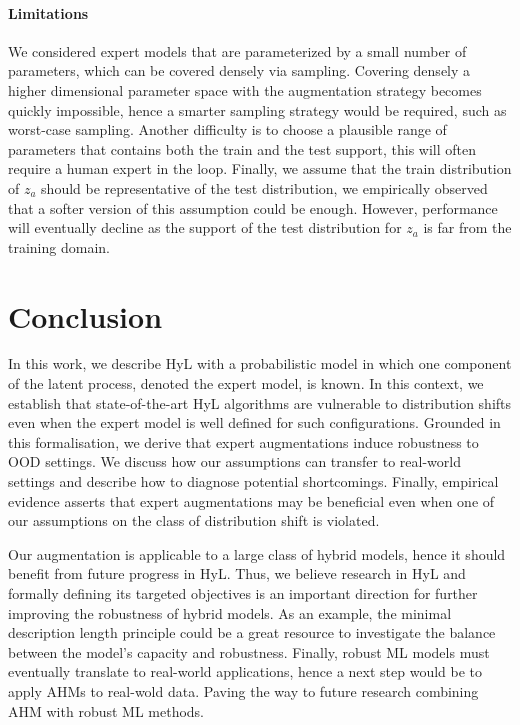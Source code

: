 \paragraph{Limitations}
We considered expert models that are parameterized by a small number of parameters, which can be covered densely via sampling. Covering densely a higher dimensional parameter space with the augmentation strategy becomes quickly impossible, hence a smarter sampling strategy would be required, such as worst-case sampling. Another difficulty is to choose a plausible range of parameters that contains both the train and the test support, this will often require a human expert in the loop. Finally, we assume that the train distribution of $z_a$ should be representative of the test distribution, we empirically observed that a softer version of this assumption could be enough. However, performance will eventually decline as the support of the test distribution for $z_a$ is far from the training domain.

\section{Conclusion}
In this work, we describe HyL with a probabilistic model in which one component of the latent process, denoted the expert model, is known. In this context, we establish that state-of-the-art HyL algorithms are vulnerable to distribution shifts even when the expert model is well defined for such configurations. Grounded in this formalisation, we derive that expert augmentations induce robustness to OOD settings. We discuss how our assumptions can transfer to real-world settings and describe how to diagnose potential shortcomings. Finally, empirical evidence asserts that expert augmentations may be beneficial even when one of our assumptions on the class of distribution shift is violated.

Our augmentation is applicable to a large class of hybrid models, hence it should benefit from future progress in HyL. Thus, we believe research in HyL and formally defining its targeted objectives is an important direction for further improving the robustness of hybrid models. As an example, the minimal description length principle \citep{mdl_book} could be a great resource to investigate the balance between the model's capacity and robustness. Finally, robust ML models must eventually translate to real-world applications, hence a next step would be to apply AHMs to real-wold data. Paving the way to future research combining AHM with robust ML methods.
